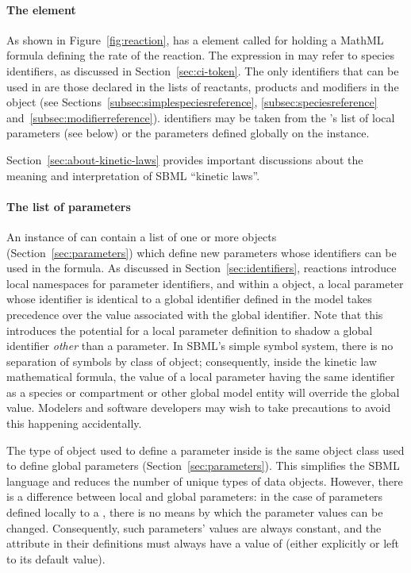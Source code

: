 \paragraph{The  element}

As shown in Figure~\vref{fig:reaction}, \KineticLaw 
has a element called  for holding a MathML formula
defining the rate of the reaction.  The expression in 
may refer to species identifiers, as discussed in
Section~\ref{sec:ci-token}.  The only \Species identifiers that
can be used in  are those declared in the lists of
reactants, products and modifiers in the \Reaction object (see
Sections~\ref{subsec:simplespeciesreference},
\ref{subsec:speciesreference} and~\ref{subsec:modifierreference}).
\Parameter identifiers may be taken from the \KineticLaw's list of
local parameters (see below) or the parameters defined globally on
the \Model instance.

Section~\ref{sec:about-kinetic-laws} provides important
discussions about the meaning and interpretation of SBML ``kinetic
laws''.


\paragraph{The list of parameters}

An instance of \KineticLaw can contain a list of
one or more \Parameter objects (Section~\ref{sec:parameters})
which define new parameters whose identifiers can be used in the
 formula.  As discussed in
Section~\ref{sec:identifiers}, reactions introduce local
namespaces for parameter identifiers, and within a
\KineticLaw object, a local parameter whose identifier is
identical to a global identifier defined in the model takes
precedence over the value associated with
the global identifier.  Note that this introduces the potential
for a local parameter definition to shadow a global identifier
\emph{other} than a parameter.  In SBML's simple symbol system, 
there is no separation of symbols by class of object;
consequently,  inside the kinetic law mathematical
formula, the value of a local parameter having the same
identifier as a species or compartment or other global model
entity will override the global value.  Modelers and software
developers may wish to take precautions to avoid this happening
accidentally.

The type of object used to define a parameter inside
\KineticLaw is the same \Parameter object class used to define global
parameters (Section~\ref{sec:parameters}).  This simplifies the
SBML language and reduces the number of unique types of data
objects.  However, there is a difference between local and global
parameters: in the case of parameters defined locally to a
\KineticLaw, there is no means by which the parameter values can
be changed.  Consequently, such parameters' values are always
constant, and the  attribute in their definitions must
always have a value of  (either explicitly or left to
its default value).


